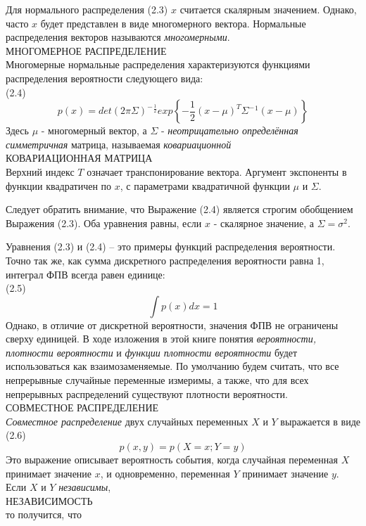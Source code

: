 \documentclass[10pt,a4paper]{article}
\begin{document}
Для нормального распределения (2.3)  $x$ считается скалярным значением. Однако, часто $x$ будет представлен в виде многомерного вектора. Нормальные распределения векторов называются \textit{многомерными}.\\
МНОГОМЕРНОЕ РАСПРЕДЕЛЕНИЕ\\
Многомерные нормальные распределения характеризуются функциями распределения вероятности следующего вида:\\
 
(2.4)$$p(x)=det(2\pi\varSigma)^-{}^\frac{1}{2}exp\left\lbrace -\frac{1}{2}(x-\mu)^T\varSigma^-{}^1(x-\mu)\right\rbrace $$
 Здесь $\mu$ - многомерный вектор, а $\varSigma$ - \textit{неотрицательно определённая симметричная} матрица, называемая \textit{ковариационной}\\
 КОВАРИАЦИОННАЯ МАТРИЦА\\
 Верхний индекс $T$ означает транспонирование вектора. Аргумент экспоненты в функции квадратичен по $x$, с параметрами квадратичной функции $\mu$ и $\varSigma$.
 
 Следует обратить внимание, что Выражение (2.4) является строгим обобщением Выражения (2.3). Оба уравнения равны, если  $x$ - скалярное значение, а $\varSigma=\sigma^2$.
 
 Уравнения (2.3) и (2.4) – это примеры функций распределения вероятности. Точно так же, как сумма дискретного распределения вероятности равна 1, интеграл ФПВ всегда равен единице:\\

 (2.5) $$\int p(x) dx = 1$$
 Однако, в отличие от дискретной вероятности, значения ФПВ не ограничены сверху единицей. В ходе изложения в этой книге понятия \textit{вероятности, плотности вероятности} и \textit{функции плотности вероятности} будет использоваться как взаимозаменяемые. По умолчанию будем  считать, что все непрерывные случайные переменные измеримы, а также, что для всех непрерывных распределений существуют плотности вероятности.\\ 
 СОВМЕСТНОЕ РАСПРЕДЕЛЕНИЕ\\
 
 \textit{Совместное распределение} двух случайных переменных $X$ и $Y$ выражается в виде\\

 (2.6) $$p(x, y) = p(X = x ; Y = y)$$
 Это выражение описывает вероятность  события, когда случайная переменная $X$ принимает значение $x$, и одновременно, переменная $Y$  принимает значение $y$. Если $X$ и $Y$ \textit{независимы},\\
 НЕЗАВИСИМОСТЬ\\
 то получится, что\\
\end{document}
